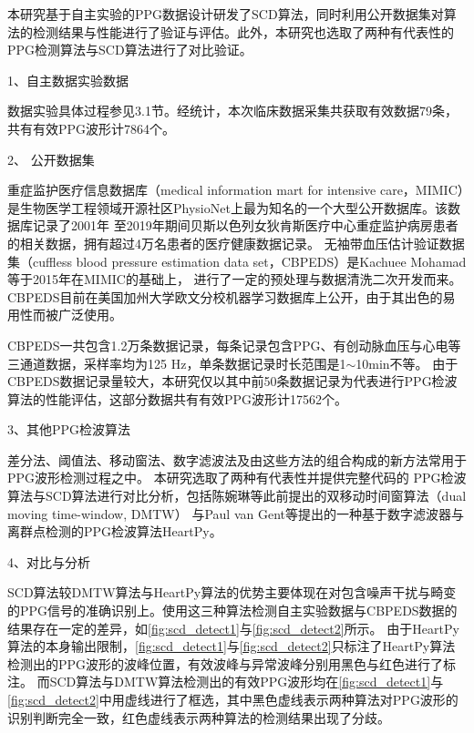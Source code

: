 本研究基于自主实验的PPG数据设计研发了SCD算法，同时利用公开数据集对算法的检测结果与性能进行了验证与评估。此外，本研究也选取了两种有代表性的PPG检测算法与SCD算法进行了对比验证。

1、自主数据实验数据

数据实验具体过程参见3.1节。经统计，本次临床数据采集共获取有效数据79条，共有有效PPG波形计7864个。

2、 公开数据集

重症监护医疗信息数据库（medical information mart for intensive care，MIMIC）是生物医学工程领域开源社区PhysioNet上最为知名的一个大型公开数据库\cite{mit2022,Goldberger2000,johnson2018mimic,mimic4}。该数据库记录了2001年
至2019年期间贝斯以色列女狄肯斯医疗中心重症监护病房患者的相关数据，拥有超过4万名患者的医疗健康数据记录\cite{johnson2018mimic}。
无袖带血压估计验证数据集（cuffless blood pressure estimation data set，CBPEDS）是Kachuee Mohamad等\cite{Kachuee2015,ucibp2022}于2015年在MIMIC的基础上，
进行了一定的预处理与数据清洗二次开发而来。CBPEDS目前在美国加州大学欧文分校机器学习数据库上公开，由于其出色的易用性而被广泛使用。

CBPEDS一共包含1.2万条数据记录，每条记录包含PPG、有创动脉血压与心电等三通道数据，采样率均为125 Hz，单条数据记录时长范围是1$\sim$10min不等。
由于CBPEDS数据记录量较大，本研究仅以其中前50条数据记录为代表进行PPG检波算法的性能评估，这部分数据共有有效PPG波形计17562个。

3、其他PPG检波算法

差分法、阈值法、移动窗法、数字滤波法及由这些方法的组合构成的新方法常用于PPG波形检测过程之中\cite{Chen2019,cwl,Chen2021,ChenH2019,QYY2008,SJ2007,van2019,van20192}。
本研究选取了两种有代表性并提供完整代码的
PPG检波算法与SCD算法进行对比分析，包括陈婉琳等\cite{Chen2019,cwl}此前提出的双移动时间窗算法（dual moving time-window, DMTW）
与Paul van Gent等\cite{van2019,van20192}提出的一种基于数字滤波器与离群点检测的PPG检波算法HeartPy。

4、对比与分析

SCD算法较DMTW算法与HeartPy算法的优势主要体现在对包含噪声干扰与畸变的PPG信号的准确识别上。使用这三种算法检测自主实验数据与CBPEDS数据的结果存在一定的差异，如\autoref{fig:scd_detect1}与\autoref{fig:scd_detect2}所示。
由于HeartPy算法的本身输出限制，\autoref{fig:scd_detect1}与\autoref{fig:scd_detect2}只标注了HeartPy算法检测出的PPG波形的波峰位置，有效波峰与异常波峰分别用黑色与红色进行了标注。
而SCD算法与DMTW算法检测出的有效PPG波形均在\autoref{fig:scd_detect1}与\autoref{fig:scd_detect2}中用虚线进行了框选，其中黑色虚线表示两种算法对PPG波形的识别判断完全一致，红色虚线表示两种算法的检测结果出现了分歧。

